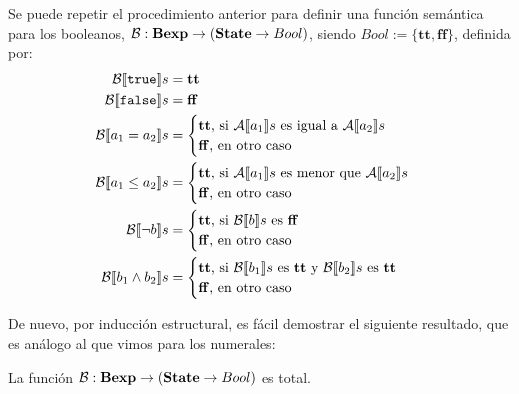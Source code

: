 Se puede repetir el procedimiento anterior para definir una función semántica para los booleanos, $\mathcal{B} : \mathbf{Bexp} \rightarrow (\mathbf{State}\rightarrow Bool)$, siendo $Bool := \{\mathbf{tt}, \mathbf{ff}\}$, definida por:
\begin{align*}
    \fc{B}{\n{true}}s & = \mathbf{tt}\\
    \fc{B}{\n{false}}s & = \mathbf{ff} \\
    \fc{B}{a_1 = a_2}s & = \begin{cases} \mathbf{tt}\text{, si }\fc{A}{a_1}s\text{ es igual a } \fc{A}{a_2}s \\ \mathbf{ff}\text{, en otro caso}\end{cases}\\
    \fc{B}{a_1 \leq a_2}s & = \begin{cases} \mathbf{tt}\text{, si }\fc{A}{a_1}s\text{ es menor que } \fc{A}{a_2}s \\ \mathbf{ff}\text{, en otro caso}\end{cases}\\
    \fc{B}{\neg b}s & = \begin{cases} \mathbf{tt}\text{, si }\fc{B}{b}s\text{ es } \mathbf{ff} \\ \mathbf{ff} \text{, en otro caso}\end{cases}\\
    \fc{B}{b_1 \land b_2}s & = \begin{cases} \mathbf{tt}\text{, si }\fc{B}{b_1}s\text{ es } \mathbf{tt}\text{ y } \fc{B}{b_2}s\text{ es } \mathbf{tt} \\ \mathbf{ff}\text{, en otro caso}\end{cases}
\end{align*}

De nuevo, por inducción estructural, es fácil demostrar el siguiente resultado, que es análogo al que vimos para los numerales:
\begin{prop}
La función $\mathcal{B} : \mathbf{Bexp} \rightarrow (\mathbf{State}\rightarrow Bool)$ es total.
\end{prop}

